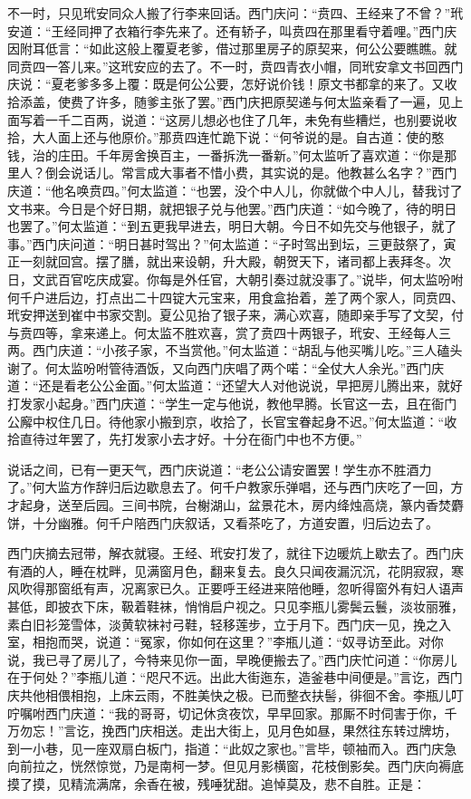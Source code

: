 不一时，只见玳安同众人搬了行李来回话。西门庆问：“贲四、王经来了不曾？”玳安道：“王经同押了衣箱行李先来了。还有轿子，叫贲四在那里看守着哩。”西门庆因附耳低言：“如此这般上覆夏老爹，借过那里房子的原契来，何公公要瞧瞧。就同贲四一答儿来。”这玳安应的去了。不一时，贲四青衣小帽，同玳安拿文书回西门庆说：“夏老爹多多上覆：既是何公公要，怎好说价钱！原文书都拿的来了。又收拾添盖，使费了许多，随爹主张了罢。”西门庆把原契递与何太监亲看了一遍，见上面写着一千二百两，说道：“这房儿想必也住了几年，未免有些糟烂，也别要说收拾，大人面上还与他原价。”那贲四连忙跪下说：“何爷说的是。自古道：使的憨钱，治的庄田。千年房舍换百主，一番拆洗一番新。”何太监听了喜欢道：“你是那里人？倒会说话儿。常言成大事者不惜小费，其实说的是。他教甚么名字？”西门庆道：“他名唤贲四。”何太监道：“也罢，没个中人儿，你就做个中人儿，替我讨了文书来。今日是个好日期，就把银子兑与他罢。”西门庆道：“如今晚了，待的明日也罢了。”何太监道：“到五更我早进去，明日大朝。今日不如先交与他银子，就了事。”西门庆问道：“明日甚时驾出？”何太监道：“子时驾出到坛，三更鼓祭了，寅正一刻就回宫。摆了膳，就出来设朝，升大殿，朝贺天下，诸司都上表拜冬。次日，文武百官吃庆成宴。你每是外任官，大朝引奏过就没事了。”说毕，何太监吩咐何千户进后边，打点出二十四锭大元宝来，用食盒抬着，差了两个家人，同贲四、玳安押送到崔中书家交割。夏公见抬了银子来，满心欢喜，随即亲手写了文契，付与贲四等，拿来递上。何太监不胜欢喜，赏了贲四十两银子，玳安、王经每人三两。西门庆道：“小孩子家，不当赏他。”何太监道：“胡乱与他买嘴儿吃。”三人磕头谢了。何太监吩咐管待酒饭，又向西门庆唱了两个喏：“全仗大人余光。”西门庆道：“还是看老公公金面。”何太监道：“还望大人对他说说，早把房儿腾出来，就好打发家小起身。”西门庆道：“学生一定与他说，教他早腾。长官这一去，且在衙门公廨中权住几日。待他家小搬到京，收拾了，长官宝眷起身不迟。”何太监道：“收拾直待过年罢了，先打发家小去才好。十分在衙门中也不方便。”

说话之间，已有一更天气，西门庆说道：“老公公请安置罢！学生亦不胜酒力了。”何大监方作辞归后边歇息去了。何千户教家乐弹唱，还与西门庆吃了一回，方才起身，送至后园。三间书院，台榭湖山，盆景花木，房内绛烛高烧，篆内香焚麝饼，十分幽雅。何千户陪西门庆叙话，又看茶吃了，方道安置，归后边去了。

西门庆摘去冠带，解衣就寝。王经、玳安打发了，就往下边暖炕上歇去了。西门庆有酒的人，睡在枕畔，见满窗月色，翻来复去。良久只闻夜漏沉沉，花阴寂寂，寒风吹得那窗纸有声，况离家已久。正要呼王经进来陪他睡，忽听得窗外有妇人语声甚低，即披衣下床，靸着鞋袜，悄悄启户视之。只见李瓶儿雾鬓云鬟，淡妆丽雅，素白旧衫笼雪体，淡黄软袜衬弓鞋，轻移莲步，立于月下。西门庆一见，挽之入室，相抱而哭，说道：“冤家，你如何在这里？”李瓶儿道：“奴寻访至此。对你说，我已寻了房儿了，今特来见你一面，早晚便搬去了。”西门庆忙问道：“你房儿在于何处？”李瓶儿道：“咫尺不远。出此大街迤东，造釜巷中间便是。”言讫，西门庆共他相偎相抱，上床云雨，不胜美快之极。已而整衣扶髻，徘徊不舍。李瓶儿叮咛嘱咐西门庆道：“我的哥哥，切记休贪夜饮，早早回家。那厮不时伺害于你，千万勿忘！”言讫，挽西门庆相送。走出大街上，见月色如昼，果然往东转过牌坊，到一小巷，见一座双扇白板门，指道：“此奴之家也。”言毕，顿袖而入。西门庆急向前拉之，恍然惊觉，乃是南柯一梦。但见月影横窗，花枝倒影矣。西门庆向褥底摸了摸，见精流满席，余香在被，残唾犹甜。追悼莫及，悲不自胜。正是：


